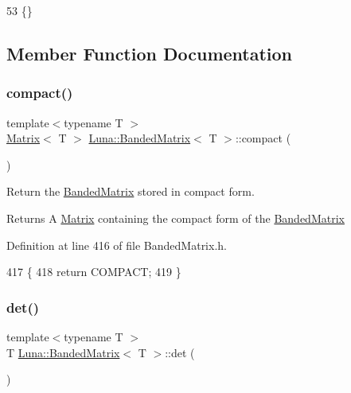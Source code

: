\begin{DoxyCode}
53 \{\}
\end{DoxyCode}


\subsection{Member Function Documentation}
\mbox{\label{classLuna_1_1BandedMatrix_ac56e0871d00c024f82174937340bd494}} 
\subsubsection{\texorpdfstring{compact()}{compact()}}
{\footnotesize\ttfamily template$<$typename T $>$ \\
\hyperlink{classLuna_1_1Matrix}{Matrix}$<$ T $>$ \hyperlink{classLuna_1_1BandedMatrix}{Luna\+::\+Banded\+Matrix}$<$ T $>$\+::compact (\begin{DoxyParamCaption}{ }\end{DoxyParamCaption})\hspace{0.3cm}{\ttfamily [inline]}}



Return the \hyperlink{classLuna_1_1BandedMatrix}{Banded\+Matrix} stored in compact form. 

\begin{DoxyReturn}{Returns}
A \hyperlink{classLuna_1_1Matrix}{Matrix} containing the compact form of the \hyperlink{classLuna_1_1BandedMatrix}{Banded\+Matrix} 
\end{DoxyReturn}


Definition at line 416 of file Banded\+Matrix.\+h.


\begin{DoxyCode}
417   \{
418     \textcolor{keywordflow}{return} COMPACT;
419   \}
\end{DoxyCode}
\mbox{\label{classLuna_1_1BandedMatrix_a6455e3c49e4b5cf11a2b604fa4a318fc}} 
\subsubsection{\texorpdfstring{det()}{det()}}
{\footnotesize\ttfamily template$<$typename T $>$ \\
T \hyperlink{classLuna_1_1BandedMatrix}{Luna\+::\+Banded\+Matrix}$<$ T $>$\+::det (\begin{DoxyParamCaption}{ }\end{DoxyParamCaption})\hspace{0.3cm}{\ttfamily [inline]}}



